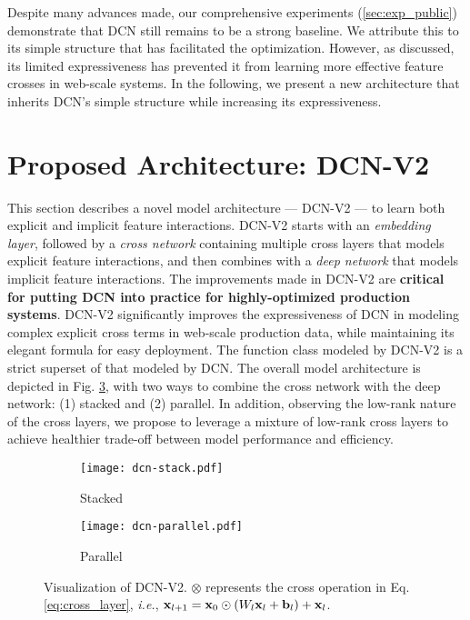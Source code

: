 \documentclass[sigconf]{acmart}
\newcommand{\vecx}{{\bf x}}
\newcommand{\vecb}{{\bf b}}
\begin{document}
Despite many advances made, our comprehensive experiments (\autoref{sec:exp_public}) demonstrate that DCN still remains to be a strong baseline. We attribute this to its simple structure that has facilitated the optimization. However, as discussed, its limited expressiveness has prevented it from learning more effective feature crosses in web-scale systems. In the following, we present a new architecture that inherits DCN's simple structure while increasing its expressiveness.






\section{Proposed Architecture: {DCN-V2}}
\label{sec:dcn-m}

This section describes a novel model architecture --- {DCN-V2} --- to learn both explicit and implicit feature interactions. {DCN-V2} starts with an \emph{embedding layer}, followed by a \emph{cross network} containing multiple cross layers that models explicit feature interactions, and then combines with a \emph{deep network} that models implicit feature interactions. The improvements made in {DCN-V2} are {\bf critical for putting {DCN} into practice for highly-optimized production systems}. {DCN-V2} significantly improves the expressiveness of DCN \cite{wang2017deep} in modeling complex explicit cross terms in web-scale production data, while maintaining its elegant formula for easy deployment. The function class modeled by {DCN-V2} is a strict superset of that modeled by DCN. The overall model architecture is depicted in Fig. \ref{fig:dcn-visualization}, with two ways to combine the cross network with the deep network: (1) stacked and (2) parallel.  In addition, observing the low-rank nature of the cross layers, we propose to leverage a mixture of low-rank cross layers to achieve healthier trade-off between model performance and efficiency.

\begin{figure}[htbp]
\centering
    \begin{subfigure}[b]{0.2\textwidth}  
    \texttt{[image: dcn-stack.pdf]}
    \caption{Stacked}
    \label{fig:dcn-stack}
    \end{subfigure}
    \hfill
    \begin{subfigure}[b]{0.27\textwidth}  
    \texttt{[image: dcn-parallel.pdf]}
    \caption{Parallel}
    \label{fig:dcn-parallel}
    \end{subfigure}
    \caption{Visualization of {DCN-V2}. $\otimes$ represents the cross operation in Eq. \eqref{eq:cross_layer}, \emph{i.e.}, $\vecx_{l+1} =\vecx_0 \odot (W_l \vecx_l +  \vecb_l) + \vecx_l$.}
    \label{fig:dcn-visualization}
\end{figure}
\end{document}

